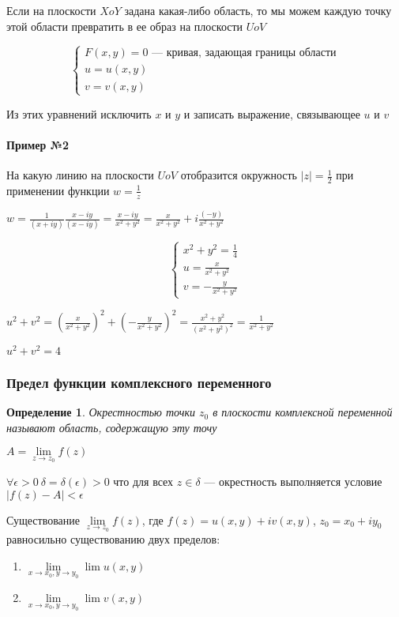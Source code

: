 \documentclass{article}
\newtheorem{definition}{Определение}
\begin{document}
Если на плоскости $X o Y$ задана какая-либо область, то мы можем каждую точку этой области превратить в ее образ на плоскости $U o V$

$$
\begin{cases}
F(x, y) = 0 \text{ — кривая, задающая границы области} \\
u = u(x, y) \\ 
v = v(x, y)
\end{cases}
$$

Из этих уравнений исключить $x$ и $y$ и записать выражение, связывающее $u$ и $v$

\hfill

\paragraph{Пример №2}

На какую линию на плоскости $U o V$ отобразится окружность $|z| = \frac{1}{2}$ при применении функции $w = \frac{1}{z}$

$w = \frac{1}{(x + i y)} \frac{x - i y}{(x - i y)} = \frac{x - i y}{x^2 + y^2} = \frac{x}{x^2 + y^2} + i \frac{(- y)}{x^2 + y^2}$

$$
\begin{cases}
    x^2 + y^2 = \frac{1}{4} \\
    u = \frac{x}{x^2 + y^2} \\
    v = -\frac{y}{x^2 + y^2}
\end{cases}
$$

$u^2 + v^2 = (\frac{x}{x^2 + y^2})^2 + (-\frac{y}{x^2 + y^2})^2 = \frac{x^2 + y^2}{(x^2 + y^2)^2} = \frac{1}{x^2 + y^2}$

$u^2 + v^2 = 4$

\subsubsection{Предел функции комплексного переменного}

\begin{definition}
    Окрестностью точки $z_0$ в плоскости комплексной переменной называют область, содержащую эту точу
\end{definition}

$A = \lim\limits_{z \to z_0} f(z)$

$\forall \epsilon > 0 \ \delta = \delta (\epsilon) > 0$ что для всех $z \in \delta$ — окрестность выполняется условие $| f(z) - A| < \epsilon$

\hfill

Существование $\lim\limits_{z \to z_0} f(z)$, где $f(z) = u(x, y) + i v(x, y)$, $z_0 = x_0 + i y_0$ равносильно существованию двух пределов:
\begin{enumerate}
    \item $\lim\limits_{x \to x_0, y \to y_0} \lim u(x, y)$
    \item $\lim\limits_{x \to x_0, y \to y_0} \lim v(x, y)$
\end{enumerate}
\end{document}
